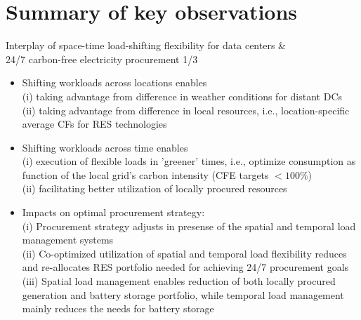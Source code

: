 \section{Summary of key observations}


\begin{frame}{Interplay of space-time load-shifting flexibility for data centers \& \\ 
  24/7 carbon-free electricity procurement 1/3}

  {\footnotesize
  \begin{itemize}

    \item [Spatial load management mechanisms] Shifting workloads across locations enables \\
          (i) taking advantage from \alert{difference in weather conditions} for distant DCs \\
          (ii) taking advantage from \alert{difference in local resources}, i.e., location-specific average CFs for RES technologies
    
    \item [Temporal load management mechanisms] Shifting workloads across time enables\\ 
          (i) \alert{execution of flexible loads in 'greener' times}, i.e., optimize consumption as function of the local grid's carbon intensity (CFE targets $<100\%$) \\
          (ii) facilitating \alert{better utilization of locally procured resources}

    \item [24/7 CFE procurement] Impacts on optimal procurement strategy:\\ 
          (i) Procurement strategy adjusts in presense of the spatial and temporal load management systems \\ 
          (ii) Co-optimized utilization of spatial and temporal load flexibility \alert{reduces and re-allocates RES portfolio} needed for achieving 24/7 procurement goals \\
          (iii) Spatial load management enables reduction of both locally procured generation and battery storage portfolio, while temporal load management mainly reduces the needs for battery storage \\

  \end{itemize}
  }
\end{frame}



